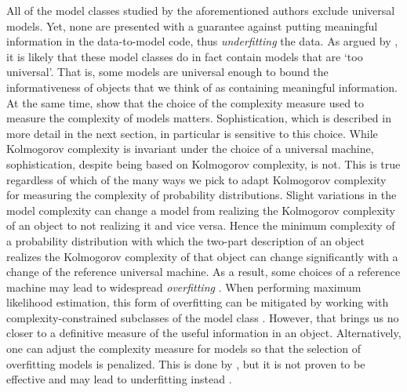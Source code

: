 All of the model classes studied by the aforementioned authors exclude universal models.
Yet, none are presented with a guarantee against putting meaningful information in the data-to-model code, thus \emph{underfitting} the data.
As argued by \textcite{bloem2015two}, it is likely that these model classes do in fact contain models that are `too universal'.
That is, some models are universal enough to bound the informativeness of objects that we think of as containing meaningful information.
At the same time, \textcite{bloem2015two,antunes2017sophistication} show that the choice of the complexity measure used to measure the complexity of models matters.
Sophistication, which is described in more detail in the next section, in particular is sensitive to this choice.
While Kolmogorov complexity is invariant under the choice of a universal machine, sophistication, despite being based on Kolmogorov complexity, is not.
This is true regardless of which of the many ways \parencite{gacs2001algorithmic} we pick to adapt Kolmogorov complexity for measuring the complexity of probability distributions.
Slight variations in the model complexity can change a model from realizing the Kolmogorov complexity of an object to not realizing it and vice versa.
Hence the minimum complexity of a probability distribution with which the two-part description of an object realizes the Kolmogorov complexity of that object can change significantly with a change of the reference universal machine.
As a result, some choices of a reference machine may lead to widespread \emph{overfitting} \parencite{bloem2015two}.
When performing maximum likelihood estimation, this form of overfitting can be mitigated by working with complexity-constrained subclasses of the model class \parencite{vereshchagin2004kolmogorov}.
However, that brings us no closer to a definitive measure of the useful information in an object.
Alternatively, one can adjust the complexity measure for models so that the selection of overfitting models is penalized.
This is done by \textcite{rissanen1983universal,antunes2009sophistication}, but it is not proven to be effective and may lead to underfitting instead \parencite{bloem2015two}.

